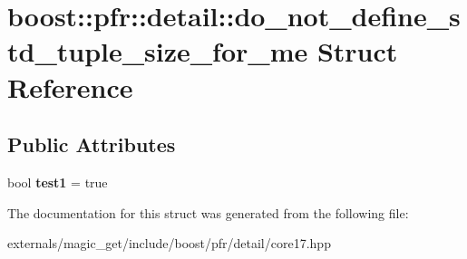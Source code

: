 \hypertarget{structboost_1_1pfr_1_1detail_1_1do__not__define__std__tuple__size__for__me}{}\section{boost\+:\+:pfr\+:\+:detail\+:\+:do\+\_\+not\+\_\+define\+\_\+std\+\_\+tuple\+\_\+size\+\_\+for\+\_\+me Struct Reference}
\label{structboost_1_1pfr_1_1detail_1_1do__not__define__std__tuple__size__for__me}
\subsection*{Public Attributes}
\begin{DoxyCompactItemize}
\item 
\mbox{\label{structboost_1_1pfr_1_1detail_1_1do__not__define__std__tuple__size__for__me_a77a709913273ca9463d053b3ff2610bd}} 
bool {\bfseries test1} = true
\end{DoxyCompactItemize}


The documentation for this struct was generated from the following file\+:\begin{DoxyCompactItemize}
\item 
externals/magic\+\_\+get/include/boost/pfr/detail/core17.\+hpp\end{DoxyCompactItemize}
